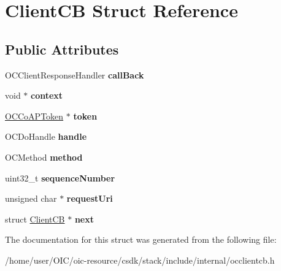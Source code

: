 \hypertarget{structClientCB}{}\section{Client\+C\+B Struct Reference}
\label{structClientCB}
\subsection*{Public Attributes}
\begin{DoxyCompactItemize}
\item 
\hypertarget{structClientCB_afe848d2a65ba12dd80ea1d120e43641a}{}O\+C\+Client\+Response\+Handler {\bfseries call\+Back}\label{structClientCB_afe848d2a65ba12dd80ea1d120e43641a}

\item 
\hypertarget{structClientCB_a7b19552585d3fcfd676db8204db207dd}{}void $\ast$ {\bfseries context}\label{structClientCB_a7b19552585d3fcfd676db8204db207dd}

\item 
\hypertarget{structClientCB_a5013c5d174a04027d6b52aa72b305d43}{}\hyperlink{structOCCoAPToken}{O\+C\+Co\+A\+P\+Token} $\ast$ {\bfseries token}\label{structClientCB_a5013c5d174a04027d6b52aa72b305d43}

\item 
\hypertarget{structClientCB_aaffbfb7900d3c4a42c26c3774bed4774}{}O\+C\+Do\+Handle {\bfseries handle}\label{structClientCB_aaffbfb7900d3c4a42c26c3774bed4774}

\item 
\hypertarget{structClientCB_a5447d60f091f8a98ea44cac035033895}{}O\+C\+Method {\bfseries method}\label{structClientCB_a5447d60f091f8a98ea44cac035033895}

\item 
\hypertarget{structClientCB_a0309e2de113d023f58a6c54d7f4bad0b}{}uint32\+\_\+t {\bfseries sequence\+Number}\label{structClientCB_a0309e2de113d023f58a6c54d7f4bad0b}

\item 
\hypertarget{structClientCB_ada9bda4c59155712b908e7cff89f04a2}{}unsigned char $\ast$ {\bfseries request\+Uri}\label{structClientCB_ada9bda4c59155712b908e7cff89f04a2}

\item 
\hypertarget{structClientCB_a59902501a0ed6c667cc35a333e551c85}{}struct \hyperlink{structClientCB}{Client\+C\+B} $\ast$ {\bfseries next}\label{structClientCB_a59902501a0ed6c667cc35a333e551c85}

\end{DoxyCompactItemize}


The documentation for this struct was generated from the following file\+:\begin{DoxyCompactItemize}
\item 
/home/user/\+O\+I\+C/oic-\/resource/csdk/stack/include/internal/occlientcb.\+h\end{DoxyCompactItemize}
